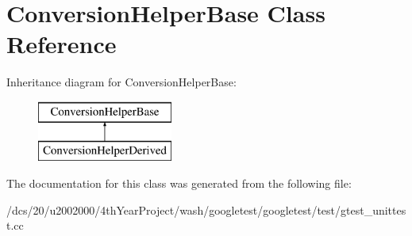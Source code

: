 \hypertarget{classConversionHelperBase}{}\section{Conversion\+Helper\+Base Class Reference}
\label{classConversionHelperBase}
Inheritance diagram for Conversion\+Helper\+Base\+:\begin{figure}[H]
\begin{center}
\leavevmode
\includegraphics[height=2.000000cm]{classConversionHelperBase}
\end{center}
\end{figure}


The documentation for this class was generated from the following file\+:\begin{DoxyCompactItemize}
\item 
/dcs/20/u2002000/4th\+Year\+Project/wash/googletest/googletest/test/gtest\+\_\+unittest.\+cc\end{DoxyCompactItemize}
